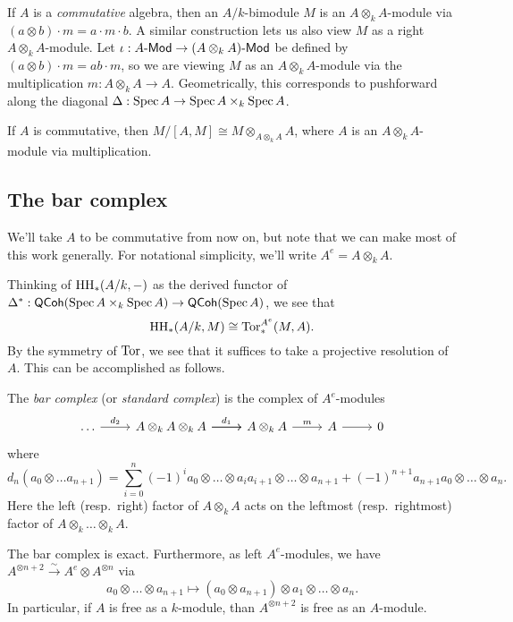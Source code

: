 \documentclass{amsart}
\begin{document}
If $A$ is a \emph{commutative} algebra, then an $A / k$-bimodule $M$ is an $A \otimes_k A$-module via $(a \otimes b) \cdot m = a \cdot m \cdot b$.
A similar construction lets us also view $M$ as a right $A \otimes_k A$-module.
Let $\iota: A\textrm{-}\mathsf{Mod} \to (A \otimes_k A)\textrm{-}\mathsf{Mod}$ be defined by $(a \otimes b) \cdot m = ab \cdot m$, so we are viewing $M$ as an $A \otimes_k A$-module via the multiplication $m: A \otimes_k A \to A$.
Geometrically, this corresponds to pushforward along the diagonal $\Delta: \operatorname{Spec} A \to \operatorname{Spec} A \times_k \operatorname{Spec} A$.

\begin{cor}
	If $A$ is commutative, then $M / [A, M] \cong M \otimes_{A \otimes_k A} A$, where $A$ is an $A \otimes_k A$-module via multiplication.
\end{cor}

\subsection{The bar complex}

We'll take $A$ to be commutative from now on, but note that we can make most of this work generally.
For notational simplicity, we'll write $A^e = A \otimes_k A$.

Thinking of $\mathrm{HH}_*(A/k, -)$ as the derived functor of $\Delta^*: \mathsf{QCoh}(\operatorname{Spec} A \times_k \operatorname{Spec} A) \to \mathsf{QCoh}(\operatorname{Spec} A)$, we see that
\[
	\mathrm{HH}_*(A/k, M) \cong \operatorname{Tor}_*^{A^e}(M, A).
\]
By the symmetry of $\operatorname{Tor}$, we see that it suffices to take a projective resolution of $A$.
This can be accomplished as follows.

\begin{dfn}
	The \emph{bar complex} (or \emph{standard complex}) is the complex of $A^e$-modules
	\[
		\begin{tikzcd}
			\dots \rar["d_2"] & A \otimes_k A \otimes_k A \rar["d_1"] \rar & A \otimes_k A \rar["m"] & A \rar & 0
		\end{tikzcd}
	\]
	where
	\[
		d_n(a_0 \otimes \dots a_{n+1}) = \sum_{i=0}^n (-1)^i a_0 \otimes \dots \otimes a_i a_{i+1} \otimes \dots \otimes a_{n+1} + (-1)^{n+1} a_{n+1} a_0 \otimes \dots \otimes a_n.
	\]
	Here the left (resp.\ right) factor of $A \otimes_k A$ acts on the leftmost (resp.\ rightmost) factor of $A \otimes_k \dots \otimes_k A$.
\end{dfn}

\begin{prop}
	The bar complex is exact.
	Furthermore, as left $A^e$-modules, we have $A^{\otimes n+2} \xrightarrow{\sim} A^e \otimes A^{\otimes n}$ via 
	\[
		a_0 \otimes \dots \otimes a_{n+1} \mapsto (a_0 \otimes a_{n+1}) \otimes a_1 \otimes \dots \otimes a_n.
	\]
	In particular, if $A$ is free as a $k$-module, than $A^{\otimes n+2}$ is free as an $A$-module.
\end{prop}
\end{document}
